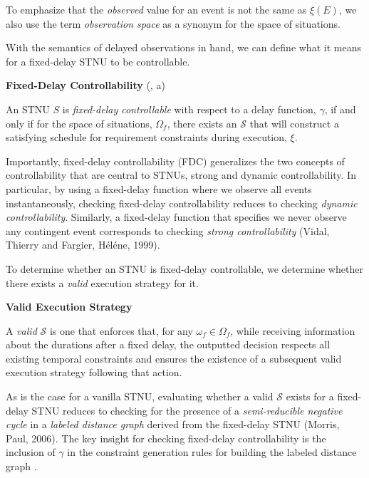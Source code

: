 \documentclass[11pt]{article}
\begin{document}
To emphasize that the \emph{observed} value for an event is not the same as \(\xi(E)\), we also use the
term \emph{observation space} as a synonym for the space of situations.

With the semantics of delayed observations in hand, we can define what it means for a fixed-delay
STNU to be controllable.

\begin{defn}
\textbf{Fixed-Delay Controllability} (, a)

An STNU \(S\) is \emph{fixed-delay controllable} with respect to a delay function, \(\gamma\), if and only if
for the space of situations, \(\Omega_{f}\), there exists an \(\mathcal{S}\) that will construct a
satisfying schedule for requirement constraints during execution, \(\xi\).
\end{defn}

Importantly, fixed-delay controllability (FDC) generalizes the two concepts of controllability that are
central to STNUs, strong and dynamic controllability. In particular, by using a fixed-delay function
where we observe all events instantaneously, checking fixed-delay controllability reduces to
checking \emph{dynamic controllability}. Similarly, a fixed-delay function that specifies we never
observe any contingent event corresponds to checking \emph{strong controllability} (Vidal, Thierry and Fargier, H{\'e}l{\'e}ne, 1999).

To determine whether an STNU is fixed-delay controllable, we determine whether there exists a \emph{valid}
execution strategy for it.

\begin{defn}
\textbf{Valid Execution Strategy}

A \emph{valid} \(\mathcal{S}\) is one that enforces that, for any \(\omega_{f} \in \Omega_{f}\), while
receiving information about the durations after a fixed delay, the outputted decision respects all
existing temporal constraints and ensures the existence of a subsequent valid execution strategy
following that action.
\end{defn}

As is the case for a vanilla STNU, evaluating whether a valid \(\mathcal{S}\) exists for a fixed-delay
STNU reduces to checking for the presence of a \emph{semi-reducible negative cycle} in a \emph{labeled
distance graph} derived from the fixed-delay STNU (Morris, Paul, 2006). The key insight for checking
fixed-delay controllability is the inclusion of \(\gamma\) in the constraint generation rules for
building the labeled distance graph \cite{bhargava:delay}.
\end{document}
